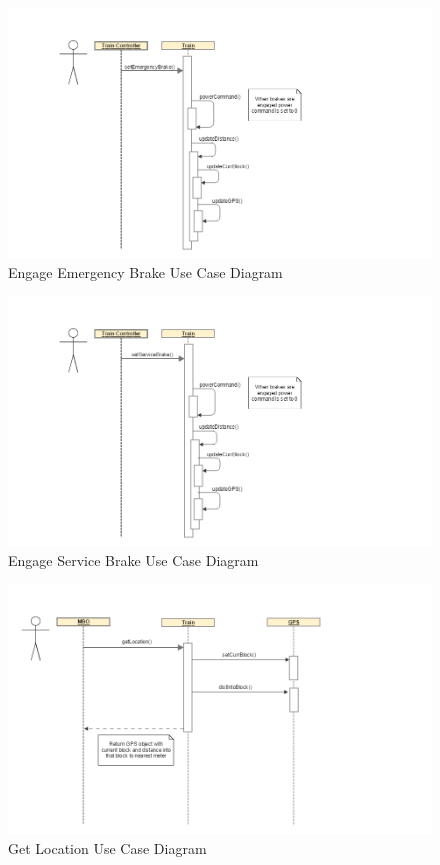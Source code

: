 \documentclass[]{article}
\begin{document}
\begin{figure}[H]
	\centering
	\includegraphics[scale=.3]{train_model_sqd_engage_emergency_brake.png}
	\caption{Engage Emergency Brake Use Case Diagram}
\end{figure}

\begin{figure}[H]
	\centering
	\includegraphics[scale=.3]{train_model_sqd_engage_service_brake.png}
	\caption{Engage Service Brake Use Case Diagram}
\end{figure}

\begin{figure}[H]
	\centering
	\includegraphics[scale=.3]{train_model_sqd_get_location.png}
	\caption{Get Location Use Case Diagram}
\end{figure}
\end{document}
